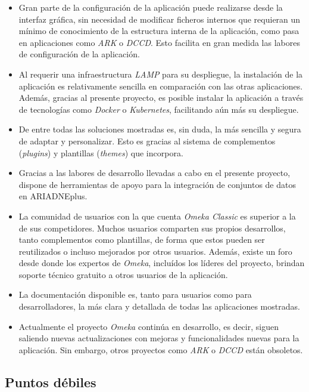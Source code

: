 \begin{itemize}
\tightlist
\item
  Gran parte de la configuración de la aplicación puede realizarse desde
  la interfaz gráfica, sin necesidad de modificar ficheros internos que
  requieran un mínimo de conocimiento de la estructura interna de la
  aplicación, como pasa en aplicaciones como \emph{ARK} o \emph{DCCD}.
  Esto facilita en gran medida las labores de configuración de la
  aplicación.
\item
  Al requerir una infraestructura \emph{LAMP} para su despliegue, la
  instalación de la aplicación es relativamente sencilla en comparación
  con las otras aplicaciones. Además, gracias al presente proyecto, es
  posible instalar la aplicación a través de tecnologías como
  \emph{Docker} o \emph{Kubernetes}, facilitando aún más su despliegue.
\item
  De entre todas las soluciones mostradas es, sin duda, la más sencilla
  y segura de adaptar y personalizar. Esto es gracias al sistema de
  complementos (\emph{plugins}) y plantillas (\emph{themes}) que
  incorpora.
\item
  Gracias a las labores de desarrollo llevadas a cabo en el presente
  proyecto, dispone de herramientas de apoyo para la integración de
  conjuntos de datos en ARIADNEplus.
\item
  La comunidad de usuarios con la que cuenta \emph{Omeka Classic} es
  superior a la de sus competidores. Muchos usuarios comparten sus
  propios desarrollos, tanto complementos como plantillas, de forma que
  estos pueden ser reutilizados o incluso mejorados por otros usuarios.
  Además, existe un foro desde donde los expertos de \emph{Omeka},
  incluídos los líderes del proyecto, brindan soporte técnico gratuito a
  otros usuarios de la aplicación.
\item
  La documentación disponible es, tanto para usuarios como para
  desarrolladores, la más clara y detallada de todas las aplicaciones
  mostradas.
\item
  Actualmente el proyecto \emph{Omeka} continúa en desarrollo, es decir,
  siguen saliendo nuevas actualizaciones con mejoras y funcionalidades
  nuevas para la aplicación. Sin embargo, otros proyectos como
  \emph{ARK} o \emph{DCCD} están obsoletos.
\end{itemize}


\subsection{Puntos débiles}

